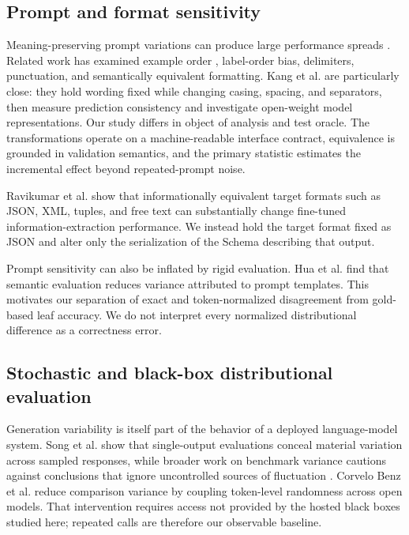 \documentclass[10pt]{article}
\begin{document}
\subsection{Prompt and format sensitivity}
Meaning-preserving prompt variations can produce large performance spreads \citep{sclar2024format}. Related work has examined example order \citep{lu2022ordered}, label-order bias, delimiters, punctuation, and semantically equivalent formatting. Kang et al. \citeyearpar{kang2025format} are particularly close: they hold wording fixed while changing casing, spacing, and separators, then measure prediction consistency and investigate open-weight model representations. Our study differs in object of analysis and test oracle. The transformations operate on a machine-readable interface contract, equivalence is grounded in validation semantics, and the primary statistic estimates the incremental effect beyond repeated-prompt noise.

Ravikumar et al. \citeyearpar{ravikumar2026lost} show that informationally equivalent target formats such as JSON, XML, tuples, and free text can substantially change fine-tuned information-extraction performance. We instead hold the target format fixed as JSON and alter only the serialization of the Schema describing that output.

Prompt sensitivity can also be inflated by rigid evaluation. Hua et al. \citeyearpar{hua2025artifact} find that semantic evaluation reduces variance attributed to prompt templates. This motivates our separation of exact and token-normalized disagreement from gold-based leaf accuracy. We do not interpret every normalized distributional difference as a correctness error.

\subsection{Stochastic and black-box distributional evaluation}
Generation variability is itself part of the behavior of a deployed language-model system. Song et al. \citeyearpar{song2024nondeterminism} show that single-output evaluations conceal material variation across sampled responses, while broader work on benchmark variance cautions against conclusions that ignore uncontrolled sources of fluctuation \citep{bouthillier2021variance}. Corvelo Benz et al. \citeyearpar{corvelobenz2026coupled} reduce comparison variance by coupling token-level randomness across open models. That intervention requires access not provided by the hosted black boxes studied here; repeated calls are therefore our observable baseline.
\end{document}
